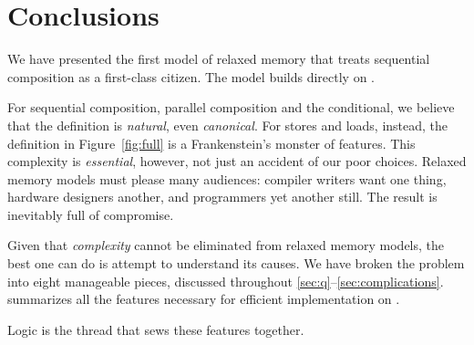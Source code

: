 \section{Conclusions}

We have presented the first model of relaxed memory that treats sequential
composition as a first-class citizen. The model builds directly on \jjr{}.

For sequential composition, parallel composition and the conditional, we
believe that the definition is \emph{natural}, even \emph{canonical}.
For stores and loads, instead, the definition in Figure~\ref{fig:full} is a
Frankenstein's monster of features.  This complexity is \emph{essential},
however, not just an accident of our poor choices.  Relaxed memory models must
please many audiences: compiler writers want one thing, hardware designers
another, and programmers yet another still.  The result is inevitably full of
compromise.

Given that \emph{complexity} cannot be eliminated from relaxed memory models,
the best one can do is attempt to understand its causes.  We have broken the
problem into eight manageable pieces, discussed throughout
\textsection\ref{sec:q}--\ref{sec:complications}.  
summarizes all the features necessary for efficient implementation on
\armeight{}.


{Logic} is the thread that sews these features together.




